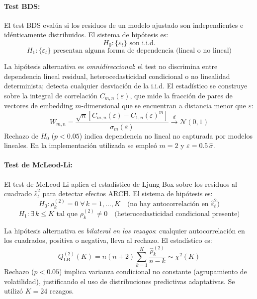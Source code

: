 \paragraph{Test BDS:}
El test BDS \parencite{BDS1996} evalúa si los residuos de un modelo ajustado son independientes e idénticamente distribuidos. El sistema de hipótesis es:
\begin{equation}
H_0: \{\varepsilon_t\} \text{ son i.i.d.}
\end{equation}
\begin{equation}
H_1: \{\varepsilon_t\} \text{ presentan alguna forma de dependencia (lineal o no lineal)}
\end{equation}

La hipótesis alternativa es \textit{omnidireccional}: el test no discrimina entre dependencia lineal residual, heterocedasticidad condicional o no linealidad determinista; detecta cualquier desviación de la i.i.d. El estadístico se construye sobre la integral de correlación $C_{m,n}(\varepsilon)$, que mide la fracción de pares de vectores de embedding $m$-dimensional que se encuentran a distancia menor que $\varepsilon$:
\begin{equation}
W_{m,n} = \frac{\sqrt{n}\left[C_{m,n}(\varepsilon) - C_{1,n}(\varepsilon)^m\right]}{\sigma_m(\varepsilon)} \xrightarrow{d} \mathcal{N}(0,1)
\end{equation}
Rechazo de $H_0$ ($p < 0.05$) indica dependencia no lineal no capturada por modelos lineales. En la implementación utilizada se empleó $m = 2$ y $\varepsilon = 0.5\,\hat{\sigma}$.

\paragraph{Test de McLeod-Li:}
El test de McLeod-Li \parencite{McLeodLi1983} aplica el estadístico de Ljung-Box sobre los residuos al cuadrado $\hat{\varepsilon}_t^2$ para detectar efectos ARCH. El sistema de hipótesis es:
\begin{equation}
H_0: \rho_k^{(2)} = 0 \;\forall\, k = 1,\ldots,K \quad \text{(no hay autocorrelación en } \hat{\varepsilon}_t^2\text{)}
\end{equation}
\begin{equation}
H_1: \exists\, k \leq K \text{ tal que } \rho_k^{(2)} \neq 0 \quad \text{(heterocedasticidad condicional presente)}
\end{equation}

La hipótesis alternativa es \textit{bilateral en los rezagos}: cualquier autocorrelación en los cuadrados, positiva o negativa, lleva al rechazo. El estadístico es:
\begin{equation}
Q_{\text{LB}}^{(2)}(K) = n(n+2) \sum_{k=1}^{K} \frac{\hat{\rho}_k^{(2)}}{n-k} \sim \chi^2(K)
\label{eq:mcleod_li}
\end{equation}
Rechazo ($p < 0.05$) implica varianza condicional no constante (agrupamiento de volatilidad), justificando el uso de distribuciones predictivas adaptativas. Se utilizó $K = 24$ rezagos.

